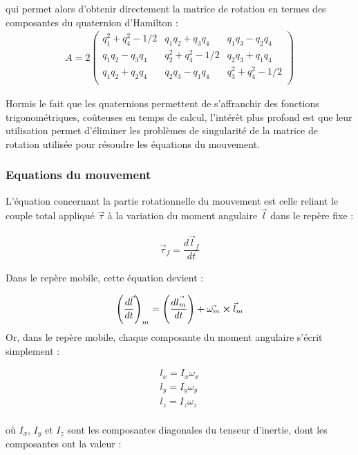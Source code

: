\documentclass[12pt]{article}
\begin{document}
qui permet alors d'obtenir directement la matrice de rotation en termes des composantes du quaternion d'Hamilton :
\begin{eqnarray}
A=2\begin{pmatrix}
q_1^2+q_4^2-1/2 & q_1 q_2+q_3 q_4 & q_1 q_3 -q_2 q_4 \\
q_1 q_2-q_3 q_4 & q_2^2+q_4^2-1/2 & q_2 q_3 +q_1 q_4 \\
q_1 q_2+q_2 q_4 & q_2 q_3-q_1 q_4 & q_3^2 +q_4^2-1/2 \\
\end{pmatrix}
\end{eqnarray}

Hormis le fait que les quaternions permettent de s'affranchir des fonctions trigonométriques, coûteuses en temps de calcul, l'intérêt plus profond est que leur utilisation permet d'éliminer les problèmes de singularité de la matrice de rotation utilisée pour résoudre les équations du mouvement.

       \subsubsection{Equations du mouvement}
       
L'équation concernant la partie rotationnelle du mouvement est celle reliant le couple total appliqué $\vec{\tau}$ à la variation du moment angulaire $\vec{l}$ dans le repère fixe :

\begin{eqnarray} \label{eqn:couplemvt}
\vec{\tau}_f = \dfrac{d\vec{l}_f}{dt}
\end{eqnarray}


Dans le repère mobile, cette équation devient :

\begin{eqnarray} \label{eqn:mtangmob}
\left(\dfrac{d\vec{l}}{dt}\right)_m=\left(\dfrac{d\vec{l_m}}{dt}\right) + \vec{\omega_m}\boldsymbol\times \vec{l}_m
\end{eqnarray}
Or, dans le repère mobile, chaque composante du moment angulaire s'écrit simplement :

\begin{eqnarray} \label{eqn:mtinertie}
l_x=I_x {\omega}_x \nonumber \\
l_y=I_y {\omega}_y \\
l_z=I_z {\omega}_z \nonumber \\
\end{eqnarray}

où $I_x$, $I_y$ et $I_z$ sont les composantes diagonales du tenseur d'inertie, dont les composantes ont la valeur :
\end{document}
